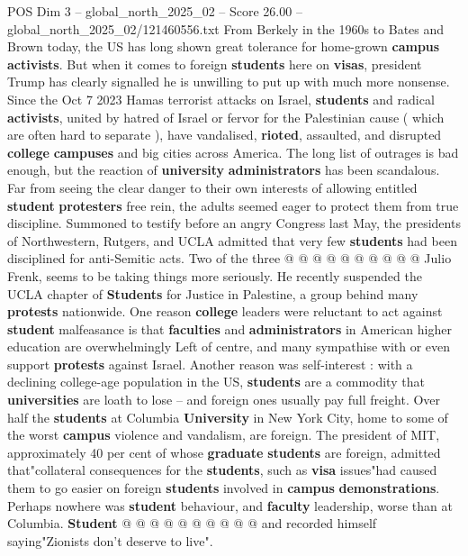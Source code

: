 \begin{textsample}{POS Dim 3 – global\_north\_2025\_02 – Score 26.00 – global\_north\_2025\_02/121460556.txt}  \label{ex:f3_pos_279}
From Berkely in the 1960s to Bates and Brown today, the US has long shown great tolerance for home-grown \textbf{campus} \textbf{activists}.
But when it comes to foreign \textbf{students} here on \textbf{visas}, president Trump has clearly signalled he is unwilling to put up with much more nonsense.
Since the Oct 7 2023 Hamas terrorist attacks on Israel, \textbf{students} and radical \textbf{activists}, united by hatred of Israel or fervor for the Palestinian cause ( which are often hard to separate ), have vandalised, \textbf{rioted}, assaulted, and disrupted \textbf{college} \textbf{campuses} and big cities across America.
The long list of outrages is bad enough, but the reaction of \textbf{university} \textbf{administrators} has been scandalous.
Far from seeing the clear danger to their own interests of allowing entitled \textbf{student} \textbf{protesters} free rein, the adults seemed eager to protect them from true discipline.
Summoned to testify before an angry Congress last May, the presidents of Northwestern, Rutgers, and UCLA admitted that very few \textbf{students} had been disciplined for anti-Semitic acts.
Two of the three @ @ @ @ @ @ @ @ @ @ Julio Frenk, seems to be taking things more seriously.
He recently suspended the UCLA chapter of \textbf{Students} for Justice in Palestine, a group behind many \textbf{protests} nationwide.
One reason \textbf{college} leaders were reluctant to act against \textbf{student} malfeasance is that \textbf{faculties} and \textbf{administrators} in American higher education are overwhelmingly Left of centre, and many sympathise with or even support \textbf{protests} against Israel.
Another reason was self-interest : with a declining college-age population in the US, \textbf{students} are a commodity that \textbf{universities} are loath to lose -- and foreign ones usually pay full freight.
Over half the \textbf{students} at Columbia \textbf{University} in New York City, home to some of the worst \textbf{campus} violence and vandalism, are foreign.
The president of MIT, approximately 40 per cent of whose \textbf{graduate} \textbf{students} are foreign, admitted that"collateral consequences for the \textbf{students}, such as \textbf{visa} issues"had caused them to go easier on foreign \textbf{students} involved in \textbf{campus} \textbf{demonstrations}.
Perhaps nowhere was \textbf{student} behaviour, and \textbf{faculty} leadership, worse than at Columbia. \textbf{Student} @ @ @ @ @ @ @ @ @ @ and recorded himself saying"Zionists don't deserve to live".

\end{textsample}
